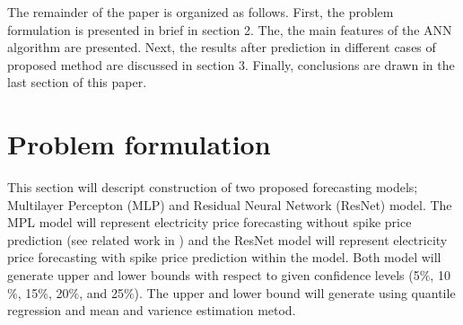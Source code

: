 \documentclass[review]{elsarticle}
\begin{document}

    The remainder of the paper is organized as follows.
    First, the problem formulation is presented in brief in section 2.
    The, the main features of the ANN algorithm are presented.
    Next, the results after prediction in different cases of proposed method  are discussed in section 3.
    Finally, conclusions are drawn in the last section of this paper.

  \section{Problem formulation}
    This section will descript construction of two proposed forecasting models; Multilayer Percepton (MLP) and Residual Neural Network (ResNet) model.
    The MPL model will represent electricity price forecasting without spike price prediction (see related work in \cite{Dudek2016}) and the ResNet model will represent electricity price forecasting with spike price prediction within the model.
    Both model will generate upper and lower bounds with respect to given confidence levels (5$\%$, 10$\%$, 15$\%$, 20$\%$, and 25$\%$).
    The upper and lower bound will generate using quantile regression and mean and varience estimation metod.
\end{document}
